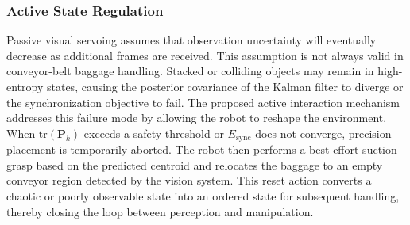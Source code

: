 \subsubsection{Active State Regulation}
Passive visual servoing assumes that observation uncertainty will eventually decrease as additional frames are received. This assumption is not always valid in conveyor-belt baggage handling. Stacked or colliding objects may remain in high-entropy states, causing the posterior covariance of the Kalman filter to diverge or the synchronization objective to fail. The proposed active interaction mechanism addresses this failure mode by allowing the robot to reshape the environment. When $\mathrm{tr}(\boldsymbol{P}_{k})$ exceeds a safety threshold or $E_{\text{sync}}$ does not converge, precision placement is temporarily aborted. The robot then performs a best-effort suction grasp based on the predicted centroid and relocates the baggage to an empty conveyor region detected by the vision system. This reset action converts a chaotic or poorly observable state into an ordered state for subsequent handling, thereby closing the loop between perception and manipulation.